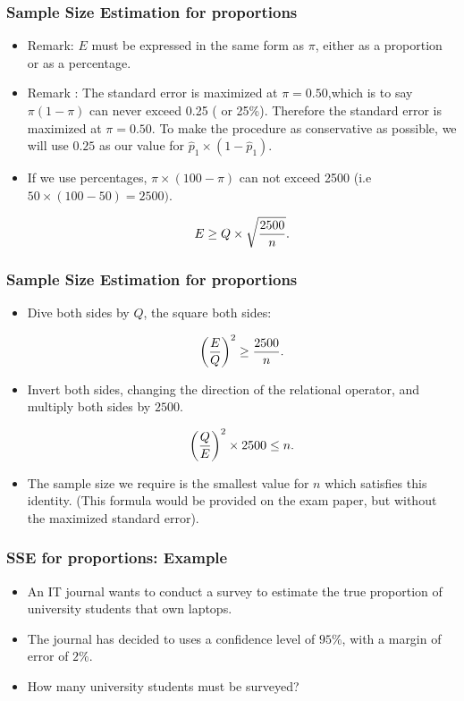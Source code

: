 \begin{frame}
\frametitle{Sample Size Estimation for proportions}
\begin{itemize}
\item Remark: $E$ must be expressed in the same form as $\pi$, either as a proportion or as a percentage.
\item Remark : The standard error is maximized at $\pi = 0.50$,which is to say $\pi(1-\pi)$ can never exceed 0.25 ( or 25\%). Therefore the standard error is maximized at $\pi = 0.50$. To make the procedure as conservative as possible, we will use $0.25$ as our value for $\hat{p}_1 \times (1 - \hat{p}_1)$.
\item If we use percentages, $\pi \times (100-\pi)$ can not exceed 2500 (i.e $ 50 \times (100-50)=2500)$.

\[ E \geq Q \times \sqrt{{2500 \over n}}. \]


\end{itemize}

\end{frame}
\begin{frame}
\frametitle{Sample Size Estimation for proportions}

\begin{itemize}

\item Dive both sides by $Q$, the square both sides:

\[ \left({E\over Q}\right)^2 \geq {2500 \over n}. \]

\item Invert both sides, changing the direction of the relational operator, and multiply both sides by $2500$.

\[ \left({Q\over E}\right)^2 \times 2500 \leq n. \]

\item The sample size we require is the smallest value for $n$ which satisfies this identity. (This formula would be provided on the exam paper, but without the maximized standard error).
\end{itemize}
\end{frame}
\begin{frame}
\frametitle{SSE for proportions: Example}
\begin{itemize}
\item An IT journal wants to conduct a survey to estimate the true proportion of university students that own laptops.
\item The journal has decided to uses a confidence level of $95\%$, with a margin of error of $2\%$.
\item How many university students must be surveyed?
\end{itemize}
\end{frame}

